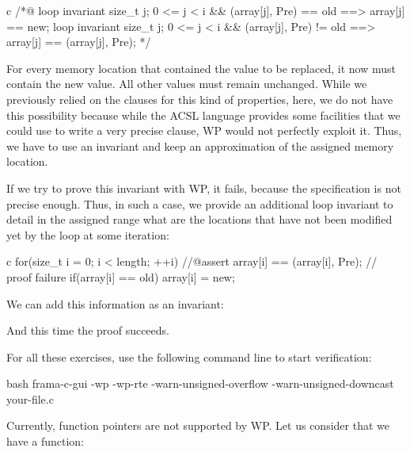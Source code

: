 \begin{CodeBlock}{c}
/*@
  loop invariant \forall size_t j; 0 <= j < i && \at(array[j], Pre) == old
                   ==> array[j] == new;
  loop invariant \forall size_t j; 0 <= j < i && \at(array[j], Pre) != old
                   ==> array[j] == \at(array[j], Pre);
*/
\end{CodeBlock}



For every memory location that contained the value to be replaced, it now must
contain the new value. All other values must remain unchanged. While we
previously relied on the  clauses for this kind of properties,
here, we do not have this possibility because while the ACSL language provides
some facilities that we could use to write a very precise 
clause, WP would not perfectly exploit it. Thus, we have to use an invariant and
keep an approximation of the assigned memory location.


If we try to prove this invariant with WP, it fails, because the
 specification is not precise enough. Thus, in such a case,
we provide an additional loop invariant to detail in the assigned range what are
the locations that have not been modified yet by the loop at some iteration:


\begin{CodeBlock}{c}
for(size_t i = 0; i < length; ++i){
    //@assert array[i] == \at(array[i], Pre); // proof failure
    if(array[i] == old) array[i] = new;
}
\end{CodeBlock}


We can add this information as an invariant:




And this time the proof succeeds.




For all these exercises, use the following command line to start verification:

\begin{CodeBlock}{bash}
frama-c-gui -wp -wp-rte -warn-unsigned-overflow -warn-unsigned-downcast your-file.c
\end{CodeBlock}




Currently, function pointers are not supported by WP. Let us consider that
we have a function:




